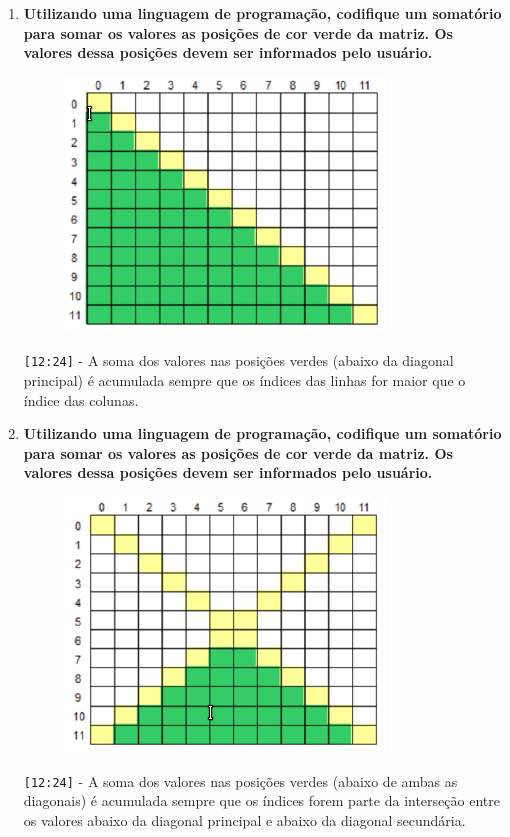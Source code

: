 \begin{enumerate}
	\pagebreak
	\item \textbf{Utilizando uma linguagem de programação, codifique um somatório para somar os valores as posições de cor verde da matriz. Os valores dessa posições devem ser informados pelo usuário.}
	\begin{figure}[H]
		\centering
		\includegraphics{7_5}
	\end{figure}
	
	\verb|[12:24]| - A soma dos valores nas posições verdes (abaixo da diagonal principal) é acumulada sempre que os índices das linhas for maior que o índice das colunas.
	
	\pagebreak
	\item \textbf{Utilizando uma linguagem de programação, codifique um somatório para somar os valores as posições de cor verde da matriz. Os valores dessa posições devem ser informados pelo usuário.}
	\begin{figure}[H]
		\centering
		\includegraphics{7_6}
	\end{figure}
	
	\verb|[12:24]| - A soma dos valores nas posições verdes (abaixo de ambas as diagonais) é acumulada sempre que os índices forem parte da interseção entre os valores abaixo da diagonal principal e abaixo da diagonal secundária.
	

\end{enumerate}
